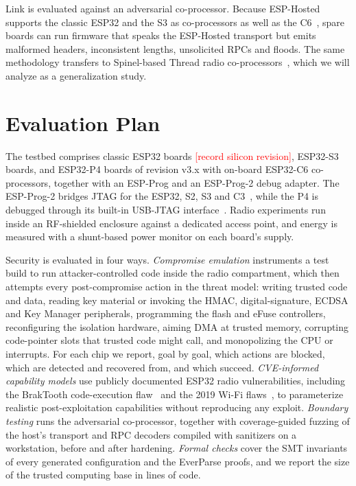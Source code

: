\documentclass[conference,10pt]{IEEEtran}
\newcommand{\TODO}[1]{\textcolor{red}{[#1]}}
\begin{document}
Link is evaluated against an adversarial co-processor. Because ESP-Hosted supports the classic ESP32 and the S3 as co-processors as well as the C6~\cite{esphostedsdio}, spare boards can run firmware that speaks the ESP-Hosted transport but emits malformed headers, inconsistent lengths, unsolicited RPCs and floods. The same methodology transfers to Spinel-based Thread radio co-processors~\cite{openthreadcp}, which we will analyze as a generalization study.

\section{Evaluation Plan}
\label{sec:eval}

The testbed comprises classic ESP32 boards \TODO{record silicon revision}, ESP32-S3 boards, and ESP32-P4 boards of revision v3.x with on-board ESP32-C6 co-processors, together with an ESP-Prog and an ESP-Prog-2 debug adapter. The ESP-Prog-2 bridges JTAG for the ESP32, S2, S3 and C3~\cite{espprog2}, while the P4 is debugged through its built-in USB-JTAG interface~\cite{esp32p4jtag}. Radio experiments run inside an RF-shielded enclosure against a dedicated access point, and energy is measured with a shunt-based power monitor on each board's supply.

Security is evaluated in four ways. \emph{Compromise emulation} instruments a test build to run attacker-controlled code inside the radio compartment, which then attempts every post-compromise action in the threat model: writing trusted code and data, reading key material or invoking the HMAC, digital-signature, ECDSA and Key Manager peripherals, programming the flash and eFuse controllers, reconfiguring the isolation hardware, aiming DMA at trusted memory, corrupting code-pointer slots that trusted code might call, and monopolizing the CPU or interrupts. For each chip we report, goal by goal, which actions are blocked, which are detected and recovered from, and which succeed. \emph{CVE-informed capability models} use publicly documented ESP32 radio vulnerabilities, including the BrakTooth code-execution flaw~\cite{nvd202128139} and the 2019 Wi-Fi flaws~\cite{espressif2019zeropmk}, to parameterize realistic post-exploitation capabilities without reproducing any exploit. \emph{Boundary testing} runs the adversarial co-processor, together with coverage-guided fuzzing of the host's transport and RPC decoders compiled with sanitizers on a workstation, before and after hardening. \emph{Formal checks} cover the SMT invariants of every generated configuration and the EverParse proofs, and we report the size of the trusted computing base in lines of code.
\end{document}
